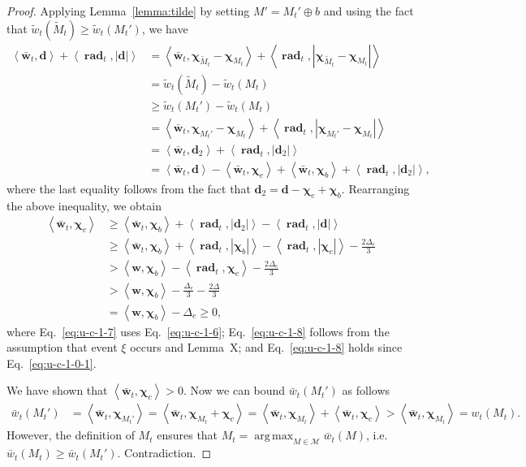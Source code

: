 \documentclass{article}
\newcommand{\M}{\mathcal M}
\DeclareMathOperator{\rad}{rad}
\DeclareMathOperator*{\argmax}{arg\,max}
\newcommand{\inn}[1]{\left\langle #1 \right\rangle}
\renewcommand{\vec}[1]{\boldsymbol{#1}}
\begin{document}
\begin{spacing}{1.1}
\begin{proof}
Applying Lemma~\ref{lemma:tilde} by setting $M' = M_t' \oplus b$ and using the fact that $\tilde w_t(\tilde M_t) \ge \tilde w_t(M_t')$, we have 
\begin{align*}
\inn{\vec {\bar w}_t, \vec d}+\inn{\vec \rad_t, |\vec d|}
& = \inn{\vec {\bar w}_t, \vec \chi_{\tilde M_t}-\vec\chi_{M_t}}+\inn{\vec \rad_t, |\vec \chi_{\tilde M_t}-\vec\chi_{M_t}|}\\
& = \tilde w_t(\tilde M_t)- \tilde w_t(M_t)\\
& \ge \tilde w_t(M_t') - \tilde w_t(M_t)\\
&= \inn{\vec {\bar w}_t, \vec \chi_{M_t'}-\vec\chi_{M_t}}+\inn{\vec \rad_t, |\vec \chi_{M_t'}-\vec\chi_{M_t}|}\\
&= \inn{\vec {\bar w}_t, \vec d_2}+\inn{\vec \rad_t, |\vec d_2|} \\
									  &= \inn{\vec {\bar w}_t, \vec d}-\inn{\vec {\bar w}_t, \vec \chi_c}+\inn{\vec {\bar w}_t,\vec\chi_b}+\inn{\vec \rad_t, |\vec d_2|},
\end{align*}
where the last equality follows from the fact that $\vec d_2 = \vec d-\vec \chi_{c}+\vec \chi_{b}$.
Rearranging the above inequality, we obtain
\begin{align}
\inn{\vec {\bar w}_t, \vec \chi_c} &\ge \inn{\vec {\bar w}_t, \vec \chi_b}+\inn{\vec \rad_t, |\vec d_2|}-\inn{\vec \rad_t, |\vec d|}\nonumber \\
&\ge  \inn{\vec {\bar w}_t, \vec \chi_b}+
\left\langle \vec \rad_t, |\vec\chi_b| \right\rangle
  -\left\langle \vec \rad_t, |\vec\chi_c| \right\rangle
  -\frac{2\Delta_e}{3} \label{eq:u-c-1-7}\\
&> \inn{\vec w, \vec \chi_b}-\inn{\vec \rad_t, \vec \chi_c}-\frac{2\Delta_e}{3} \label{eq:u-c-1-8}\\
&> \inn{\vec w, \vec \chi_b}-\frac{\Delta_e}{3}-\frac{2\Delta}{3} \label{eq:u-c-1-9}\\
&= \inn{\vec w, \vec \chi_b}-\Delta_e \ge 0,
\end{align}
where Eq.~\eqref{eq:u-c-1-7} uses Eq.~\eqref{eq:u-c-1-6}; 
Eq.~\eqref{eq:u-c-1-8} follows from the assumption that event $\xi$ occurs and Lemma~X;
and Eq.~\eqref{eq:u-c-1-8} holds since Eq.~\eqref{eq:u-c-1-0-1}.

We have shown that $\inn{\vec {\bar w}_t,\vec \chi_c}>0$. Now we can bound $\bar w_t(M_t')$ as follows
\begin{align*}
 \bar w_t(M_t') &= \inn{\vec {\bar w}_t, \vec \chi_{M_t'}} = \inn{\vec {\bar w}_t, \vec \chi_{M_t}+\vec \chi_c} =
 \inn{\vec {\bar w}_t, \vec \chi_{M_t}}+\inn{\vec {\bar w}_t, \vec \chi_c} > \inn{\vec {\bar w}_t, \vec \chi_{M_t}} = w_t(M_t).
\end{align*}
However, the definition of $M_t$ ensures that $M_t = \argmax_{M\in\M} \bar w_t(M)$, i.e. $\bar w_t(M_t) \ge \bar w_t(M_t')$. Contradiction.


\end{proof}
\end{spacing}
\end{document}

